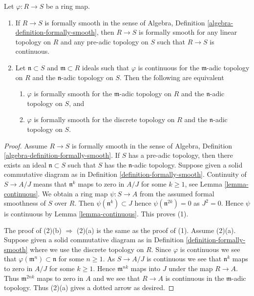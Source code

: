 \begin{lemma}
\label{lemma-formally-smooth}
Let $\varphi : R \to S$ be a ring map.
\begin{enumerate}
\item If $R \to S$ is formally smooth in
the sense of Algebra, Definition \ref{algebra-definition-formally-smooth},
then $R \to S$ is formally smooth for any linear topology on $R$ and
any pre-adic topology on $S$ such that $R \to S$ is continuous.
\item Let $\mathfrak n \subset S$ and $\mathfrak m \subset R$
ideals such that $\varphi$ is continuous for the $\mathfrak m$-adic
topology on $R$ and the $\mathfrak n$-adic topology
on $S$. Then the following are equivalent
\begin{enumerate}
\item $\varphi$ is formally smooth for the $\mathfrak m$-adic topology on
$R$ and the $\mathfrak n$-adic topology on $S$, and
\item $\varphi$ is formally smooth for the discrete topology
on $R$ and the $\mathfrak n$-adic topology on $S$.
\end{enumerate}
\end{enumerate}
\end{lemma}

\begin{proof}
Assume $R \to S$ is formally smooth in
the sense of Algebra, Definition \ref{algebra-definition-formally-smooth}.
If $S$ has a pre-adic topology, then
there exists an ideal $\mathfrak n \subset S$ such that $S$ has the
$\mathfrak n$-adic topology. Suppose given a solid commutative diagram as in
Definition \ref{definition-formally-smooth}.
Continuity of $S \to A/J$ means that $\mathfrak n^k$ maps to zero
in $A/J$ for some $k \geq 1$, see Lemma \ref{lemma-continuous}.
We obtain a ring map $\psi : S \to A$ from the assumed formal smoothness of
$S$ over $R$. Then $\psi(\mathfrak n^k) \subset J$ hence
$\psi(\mathfrak n^{2k}) = 0$ as $J^2 = 0$. Hence $\psi$ is continuous by
Lemma \ref{lemma-continuous}. This proves (1).

\medskip\noindent
The proof of (2)(b) $\Rightarrow$ (2)(a) is the same as the proof of (1).
Assume (2)(a). Suppose given a solid commutative diagram as in
Definition \ref{definition-formally-smooth} where we use the discrete
topology on $R$. Since $\varphi$ is continuous we see that
$\varphi(\mathfrak m^n) \subset \mathfrak n$ for some $n \geq 1$.
As $S \to A/J$ is continuous we see that $\mathfrak n^k$ maps to
zero in $A/J$ for some $k \geq 1$. Hence $\mathfrak m^{nk}$ maps
into $J$ under the map $R \to A$. Thus $\mathfrak m^{2nk}$ maps to zero
in $A$ and we see that $R \to A$ is continuous in the $\mathfrak m$-adic
topology. Thus (2)(a) gives a dotted arrow as desired.
\end{proof}

